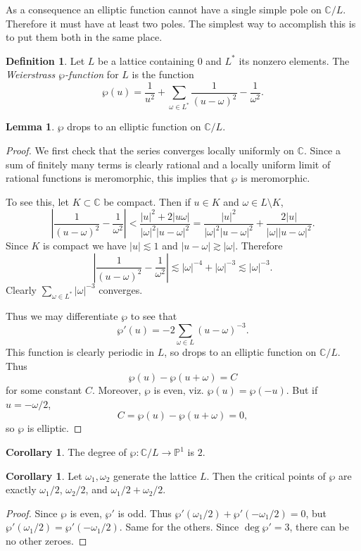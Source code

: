 \documentclass[12pt]{report}
\newcommand{\CC}{\mathbb{C}}
\newcommand{\PP}{\mathbb{P}}
\newcommand{\dfn}[1]{\emph{#1}\index{#1}}
\theoremstyle{definition}
\newtheorem{lemma}[theorem]{Lemma}
\newtheorem{corollary}[theorem]{Corollary}
\newtheorem{definition}[theorem]{Definition}
\begin{document}
As a consequence an elliptic function cannot have a single simple pole on $\CC/L$. Therefore it must have at least two poles. The simplest way to accomplish this is to put them both in the same place.
\begin{definition}
Let $L$ be a lattice containing $0$ and $L^*$ its nonzero elements.
The \dfn{Weierstrass $\wp$-function} for $L$ is the function
$$\wp(u) = \frac{1}{u^2} + \sum_{\omega \in L^*} \frac{1}{(u - \omega)^2} - \frac{1}{\omega^2}.$$
\end{definition}
\begin{lemma}
$\wp$ drops to an elliptic function on $\CC/L$.
\end{lemma}
\begin{proof}
We first check that the series converges locally uniformly on $\CC$. Since a sum of finitely many terms is clearly rational and a locally uniform limit of rational functions is meromorphic, this implies that $\wp$ is meromorphic.

To see this, let $K \subset \CC$ be compact. Then if $u \in K$ and $\omega \in L \setminus K$,
$$\left|\frac{1}{(u - \omega)^2} - \frac{1}{\omega^2}\right| < \frac{|u|^2 + 2|u\omega|}{|\omega|^2|u - \omega|^2} = \frac{|u|^2}{|\omega|^2|u - \omega|^2} + \frac{2|u|}{|\omega||u - \omega|^2}.$$
Since $K$ is compact we have $|u| \lesssim 1$ and $|u - \omega| \gtrsim |\omega|$. Therefore
$$\left|\frac{1}{(u - \omega)^2} - \frac{1}{\omega^2}\right| \lesssim |\omega|^{-4} + |\omega|^{-3} \lesssim |\omega|^{-3}.$$
Clearly $\sum_{\omega \in L^*} |\omega|^{-3}$ converges.

Thus we may differentiate $\wp$ to see that
$$\wp'(u) = -2\sum_{\omega \in L} (u - \omega)^{-3}.$$
This function is clearly periodic in $L$, so drops to an elliptic function on $\CC/L$. Thus
$$\wp(u) - \wp(u + \omega) = C$$
for some constant $C$. Moreover, $\wp$ is even, viz. $\wp(u) = \wp(-u)$. But if $u = -\omega/2$,
$$C = \wp(u) - \wp(u + \omega) = 0,$$
so $\wp$ is elliptic.
\end{proof}
\begin{corollary}
The degree of $\wp: \CC/L \to \PP^1$ is $2$.
\end{corollary}
\begin{corollary}
Let $\omega_1,\omega_2$ generate the lattice $L$. Then the critical points of $\wp$ are exactly $\omega_1/2$, $\omega_2/2$, and $\omega_1/2 + \omega_2/2$.
\end{corollary}
\begin{proof}
Since $\wp$ is even, $\wp'$ is odd. Thus $\wp'(\omega_1/2) + \wp'(-\omega_1/2) = 0$, but $\wp'(\omega_1/2) = \wp'(-\omega_1/2)$. Same for the others.
Since $\deg \wp' = 3$, there can be no other zeroes.
\end{proof}
\end{document}
